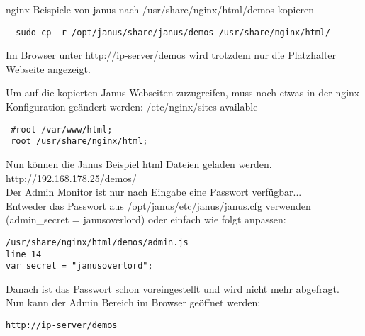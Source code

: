 nginx Beispiele von janus nach /usr/share/nginx/html/demos kopieren
\begin{verbatim}
  sudo cp -r /opt/janus/share/janus/demos /usr/share/nginx/html/
\end{verbatim}
Im Browser unter http://ip-server/demos
wird trotzdem nur die Platzhalter Webseite angezeigt.

Um auf die kopierten Janus Webseiten zuzugreifen, muss noch etwas in der nginx Konfiguration geändert werden: /etc/nginx/sites-available
\begin{verbatim}
 #root /var/www/html;
 root /usr/share/nginx/html;
\end{verbatim}
Nun können die  Janus Beispiel html Dateien geladen werden.\\
http://192.168.178.25/demos/\\

Der Admin Monitor ist nur nach Eingabe eine Passwort verfügbar...\\
Entweder das Passwort aus /opt/janus/etc/janus/janus.cfg verwenden (admin\_secret = janusoverlord) oder einfach wie folgt anpassen:
\begin{verbatim}
/usr/share/nginx/html/demos/admin.js
line 14
var secret = "janusoverlord";
\end{verbatim}
Danach ist das Passwort schon voreingestellt und wird nicht mehr abgefragt.\\
Nun kann der Admin Bereich im Browser geöffnet werden:
\begin{verbatim}
http://ip-server/demos
\end{verbatim}

